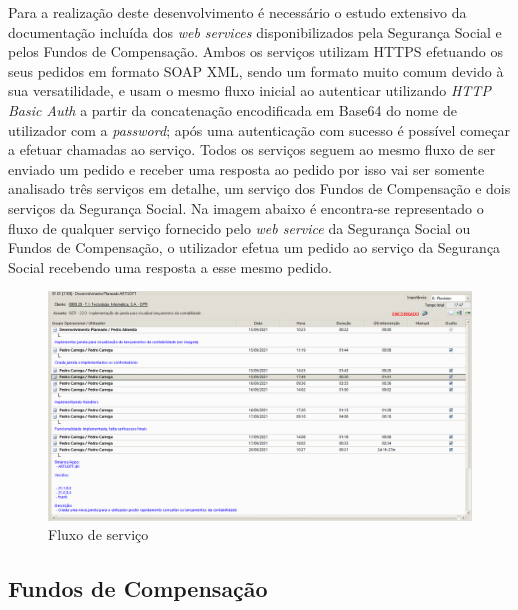\documentclass[sigplan]{acmart}
\begin{document}
Para a realização deste desenvolvimento é necessário o estudo extensivo da documentação incluída dos \textit{web services} disponibilizados pela Segurança Social e pelos Fundos de Compensação. Ambos os serviços utilizam HTTPS efetuando os seus pedidos em formato SOAP XML, sendo um formato muito comum devido à sua versatilidade, e usam o mesmo fluxo inicial ao autenticar utilizando \textit{HTTP Basic Auth} a partir da concatenação encodificada em Base64 do nome de utilizador com a \textit{password}; após uma autenticação com sucesso é possível começar a efetuar chamadas ao serviço. Todos os serviços seguem ao mesmo fluxo de ser enviado um pedido e receber uma resposta ao pedido por isso vai ser somente analisado três serviços em detalhe, um serviço dos Fundos de Compensação e dois serviços da Segurança Social. Na imagem abaixo é encontra-se representado o fluxo de qualquer serviço fornecido pelo \textit{web service} da Segurança Social ou Fundos de Compensação, o utilizador efetua um pedido ao serviço da Segurança Social recebendo uma resposta a esse mesmo pedido.
\FloatBarrier
\begin{figure}[htbp] %
	\centerline{\includegraphics[width=\linewidth]{figures/evento_formacao.png}}
	\caption{Fluxo de serviço}
	\label{fig3}
\end{figure}
\FloatBarrier


\subsection{Fundos de Compensação}
\end{document}
